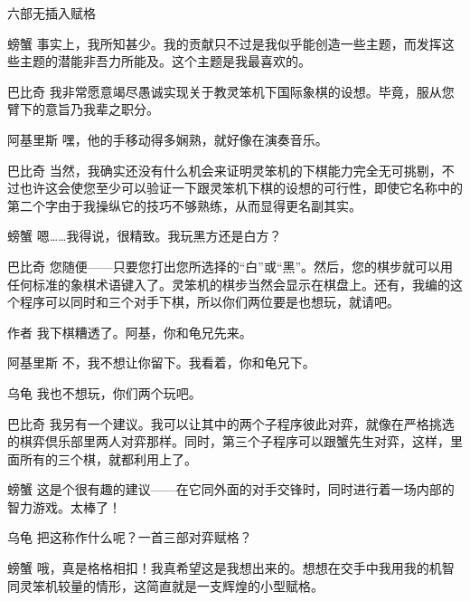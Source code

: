 \begin{dialog}{六部无插入赋格}
\begin{dialogue}
\item[螃蟹]事实上，我所知甚少。我的贡献只不过是我似乎能创造一些主题，而发挥这些主题的潜能非吾力所能及。这个主题是我最喜欢的。

\item[巴比奇]我非常愿意竭尽愚诚实现关于教灵笨机下国际象棋的设想。毕竟，服从您臂下的意旨乃我辈之职分。

\item[阿基里斯]嘿，他的手移动得多娴熟，就好像在演奏音乐。

\item[巴比奇]当然，我确实还没有什么机会来证明灵笨机的下棋能力完全无可挑剔，不过也许这会使您至少可以验证一下跟灵笨机下棋的设想的可行性，即使它名称中的第二个字由于我操纵它的技巧不够熟练，从而显得更名副其实。


\item[螃蟹]嗯……我得说，很精致。我玩黑方还是白方？

\item[巴比奇]您随便——只要您打出您所选择的“白”或“黑”。然后，您的棋步就可以用任何标准的象棋术语键入了。灵笨机的棋步当然会显示在棋盘上。还有，我编的这个程序可以同时和三个对手下棋，所以你们两位要是也想玩，就请吧。

\item[作者]我下棋糟透了。阿基，你和龟兄先来。

\item[阿基里斯]不，我不想让你留下。我看着，你和龟兄下。

\item[乌龟]我也不想玩，你们两个玩吧。

\item[巴比奇]我另有一个建议。我可以让其中的两个子程序彼此对弈，就像在严格挑选的棋弈倶乐部里两人对弈那样。同时，第三个子程序可以跟蟹先生对弈，这样，里面所有的三个棋，就都利用上了。

\item[螃蟹]这是个很有趣的建议——在它同外面的对手交锋时，同时进行着一场内部的智力游戏。太棒了！

\item[乌龟]把这称作什么呢？一首三部对弈赋格？

\item[螃蟹]哦，真是格格相扣！我真希望这是我想出来的。想想在交手中我用我的机智同灵笨机较量的情形，这简直就是一支辉煌的小型赋格。


\end{dialogue}
\end{dialog}
